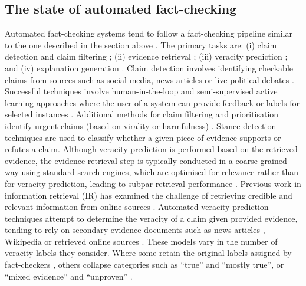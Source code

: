 \subsection{The state of automated fact-checking} \label{relwork:automated_FC}
Automated fact-checking systems tend to follow a fact-checking pipeline similar to the one described in the section above \cite{Das2023state,guo2022survey,dmonte2024claimverificationagelarge}. The primary tasks are: 
(i) claim detection and claim filtering \cite{hassan2017ClaimBuster,hassan2017TowardsClaimBuster}; 
(ii) evidence retrieval \cite{clarke2020overview,li2021anasearch};
(iii) veracity prediction \cite{alhindi2018evidence,thorne2018fever,augenstein2019multifc}; and (iv) explanation generation \cite{atanasova2020generating,kotonya2020fcpublichealth}.
Claim detection involves identifying checkable claims 
from sources such as social media, news articles or live political debates \cite{hassan2017ClaimBuster}. 
Successful techniques involve human-in-the-loop and semi-supervised active learning approaches where the user of a system can provide feedback or labels for selected instances \cite{farinneya2021activelearningrumor, tschiatschek2018fakenewsdetection}. Additional methods for claim filtering and prioritisation identify urgent claims (based on virality or harmfulness) \cite{nakov2022clef,adair2020automatedjournalism,wright-augenstein-2020-claim}.
Stance detection techniques \cite{augenstein-etal-2016-stance,ferreira2016emergent,popat2018declare} are used to classify whether a given piece of evidence supports or refutes a claim. 
Although veracity prediction is performed based on the retrieved evidence, the evidence retrieval step is typically conducted in a coarse-grained way using standard search engines, which are optimised for relevance rather than for veracity prediction, leading to subpar retrieval performance \cite{Das2023state,hardalov-etal-2022-survey,hagstrom2024realitycheckcontextutilisation}. Previous work in information retrieval (IR) has examined the challenge of retrieving credible and relevant information from online sources \cite{clarke2020overview}.
Automated veracity prediction techniques attempt to determine the veracity of a claim given provided evidence,
tending to rely on secondary evidence documents such as news articles \cite{pomerleau2017fakenews,ferreira2016emergent}, Wikipedia \cite{thorne2018fever} or retrieved online sources \cite{augenstein2019multifc}.
These models vary in the number of veracity labels they consider. Where some retain the original labels assigned by fact-checkers \cite{augenstein2019multifc}, others collapse categories such as ``true'' and ``mostly true'', or ``mixed evidence'' and ``unproven'' \cite{hanselowski2019corpus,kotonya2020fcpublichealth,gupta2021xfactmultilingual}.


